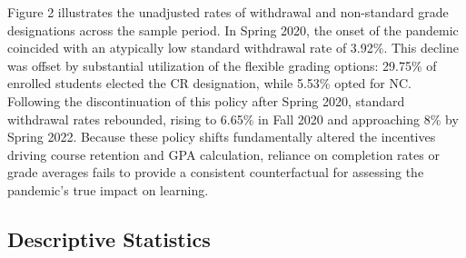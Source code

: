 \documentclass[
  12pt,
  letterpaper,
  DIV=11,
  numbers=noendperiod]{scrartcl}
\begin{document}
Figure 2 illustrates the unadjusted rates of withdrawal and non-standard
grade designations across the sample period. In Spring 2020, the onset
of the pandemic coincided with an atypically low standard withdrawal
rate of 3.92\%. This decline was offset by substantial utilization of
the flexible grading options: 29.75\% of enrolled students elected the
CR designation, while 5.53\% opted for NC. Following the discontinuation
of this policy after Spring 2020, standard withdrawal rates rebounded,
rising to 6.65\% in Fall 2020 and approaching 8\% by Spring 2022.
Because these policy shifts fundamentally altered the incentives driving
course retention and GPA calculation, reliance on completion rates or
grade averages fails to provide a consistent counterfactual for
assessing the pandemic's true impact on learning.

\subsection{Descriptive Statistics}\label{descriptive-statistics}
\end{document}
